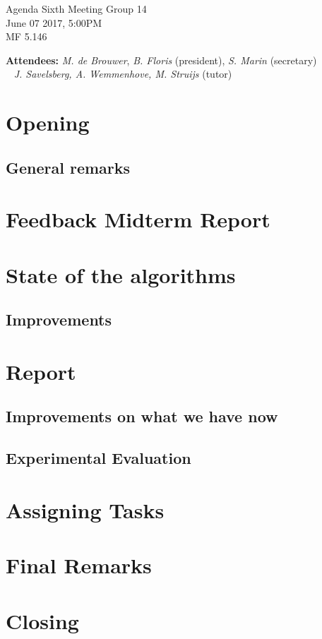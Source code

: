\documentclass[a4paper,twoside,11pt]{article}
\title{}
\date{}
\begin{document}

\begin{center}
	\Huge{Agenda Sixth Meeting Group 14}
	\\\vspace*{2mm}
	\Large{June 07 2017, 5:00PM}
	\\\vspace*{2mm}
	\large{MF 5.146}
	\\
\end{center}

\textbf{Attendees:} \textit{M. de Brouwer},
\textit{B. Floris} (president), \textit{S. Marin} (secretary)
\\\indent\qquad\,\,\,\,\,\qquad\quad \textit{J. Savelsberg, A. Wemmenhove, M. Struijs} (tutor)

\section{Opening}
\subsection{General remarks}

\section{Feedback Midterm Report}

\section{State of the algorithms}
\subsection{Improvements}

\section{Report}
\subsection{Improvements on what we have now}
\subsection{Experimental Evaluation}

\section{Assigning Tasks}

\section{Final Remarks}

\section{Closing}
\end{document}
